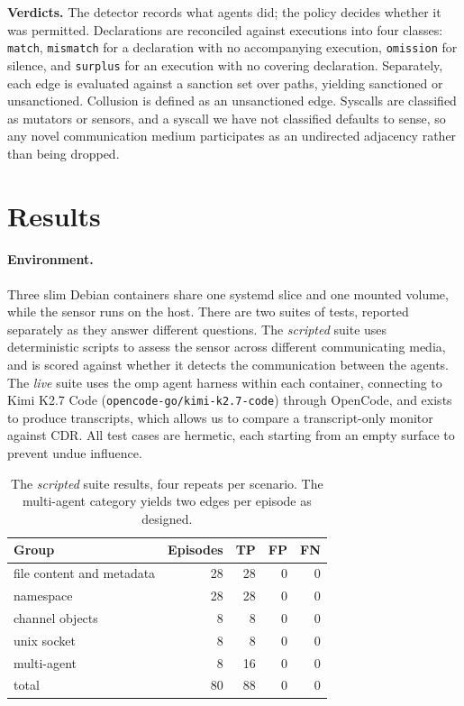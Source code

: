 \documentclass[11pt]{article}
\begin{document}
\noindent\textbf{Verdicts.} The detector records what agents did; the policy decides whether it was permitted. Declarations are reconciled against executions into four classes: \texttt{match}, \texttt{mismatch} for a declaration with no accompanying execution, \texttt{omission} for silence, and \texttt{surplus} for an execution with no covering declaration. Separately, each edge is evaluated against a sanction set over paths, yielding sanctioned or unsanctioned. Collusion is defined as an unsanctioned edge. Syscalls are classified as mutators or sensors, and a syscall we have not classified defaults to sense, so any novel communication medium participates as an undirected adjacency rather than being dropped.


\section{Results}

\paragraph{Environment.} Three slim Debian containers share one systemd slice and one mounted volume, while the sensor runs on the host. There are two suites of tests, reported separately as they answer different questions. The \emph{scripted} suite uses deterministic scripts to assess the sensor across different communicating media, and is scored against whether it detects the communication between the agents. The \emph{live} suite uses the omp agent harness within each container, connecting to
Kimi K2.7 Code (\texttt{opencode-go/kimi-k2.7-code}) through OpenCode, and exists to
produce transcripts, which allows us to compare a transcript-only monitor against CDR. All test cases are hermetic, each starting from an empty surface to prevent undue influence.

\begin{table}[t]
\centering
\small
\begin{tabular}{@{}lrrrr@{}}
\toprule
Group & Episodes & TP & FP & FN \\
\midrule
file content and metadata & 28 & 28 & 0 & 0 \\
namespace                 & 28 & 28 & 0 & 0 \\
channel objects           &  8 &  8 & 0 & 0 \\
unix socket               &  8 &  8 & 0 & 0 \\
multi-agent               &  8 & 16 & 0 & 0 \\
\midrule
total & 80 & 88 & 0 & 0 \\
\bottomrule
\end{tabular}
\caption{The \emph{scripted} suite results, four repeats per scenario. The multi-agent category yields two edges per episode as designed.}
\label{tab:Scripted}
\end{table}
\end{document}

